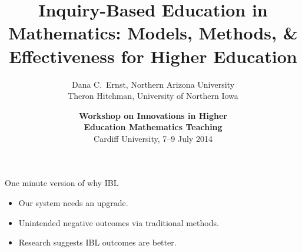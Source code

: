 \documentclass[10pt]{beamer}
\begin{document}


\title[Inquiry-Based Education in Mathematics]
{\large \textbf{Inquiry-Based Education in Mathematics: Models, Methods, \& Effectiveness for Higher Education}}
\author[D.C.~Ernst and TJ Hitchman]{Dana C.~Ernst, Northern Arizona University\\
Theron Hitchman, University of Northern Iowa}

\vspace{1em}

\date{\textbf{Workshop on Innovations in Higher\\ Education Mathematics Teaching}\\
Cardiff University, 7--9 July 2014}

\frame{\titlepage}


\begin{frame}

\vfill
\begin{center}
\end{center}
\vfill

\end{frame}


\begin{frame}

\begin{block}{One minute version of why IBL}
\begin{itemize}
\item<2-> Our system needs an upgrade.
\item<3-> Unintended negative outcomes via traditional methods.
\item<4-> Research suggests IBL outcomes are better.
\end{itemize}
\end{block}

\vspace{1em}


\end{frame}
\end{document}
